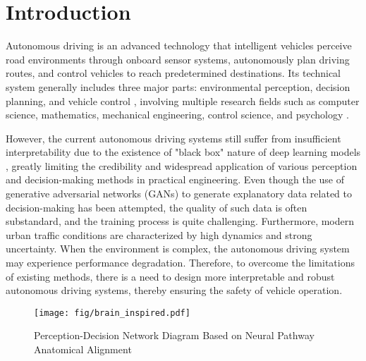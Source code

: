 \section{Introduction}
\label{sec:intro}
\hspace{1pc}Autonomous driving \cite{urmson2008autonomous} is an advanced technology that intelligent vehicles perceive road environments through onboard sensor systems, autonomously plan driving routes, and control vehicles to reach predetermined destinations. 
Its technical system generally includes three major parts: environmental perception, decision planning, and vehicle control \cite{amini2020learning, montemerlo2008junior}, involving multiple research fields such as computer science, mathematics, mechanical engineering, control science, and psychology \cite{chen2015deepdriving}.


However, the current autonomous driving systems still suffer from insufficient interpretability due to the existence of "black box" nature of deep learning models \cite{7979332}, greatly limiting the credibility and widespread application of various perception and decision-making methods in practical engineering. 
Even though the use of generative adversarial networks (GANs) \cite{zugner2020adversarial} to generate explanatory data related to decision-making has been attempted, the quality of such data is often substandard, and the training process is quite challenging. 
Furthermore, modern urban traffic conditions are characterized by high dynamics and strong uncertainty. 
When the environment is complex, the autonomous driving system may experience performance degradation. 
Therefore, to overcome the limitations of existing methods, there is a need to design more interpretable and robust autonomous driving systems, thereby ensuring the safety of vehicle operation.
\begin{figure}[t]
	\centering
	\texttt{[image: fig/brain\_inspired.pdf]}
	\caption{Perception-Decision Network Diagram Based on Neural Pathway Anatomical Alignment}
	\label{fig:fig1}
\end{figure}

